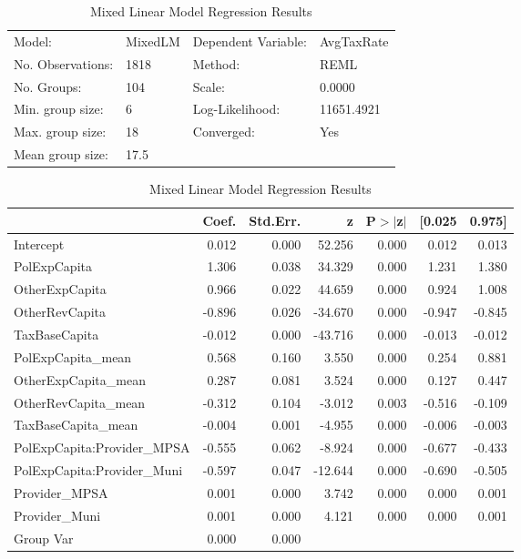 \begin{table}
\caption{Mixed Linear Model Regression Results}
\label{}
\begin{center}
\begin{tabular}{llll}
\hline
Model:            & MixedLM & Dependent Variable: & AvgTaxRate  \\
No. Observations: & 1818    & Method:             & REML        \\
No. Groups:       & 104     & Scale:              & 0.0000      \\
Min. group size:  & 6       & Log-Likelihood:     & 11651.4921  \\
Max. group size:  & 18      & Converged:          & Yes         \\
Mean group size:  & 17.5    &                     &             \\
\hline
\end{tabular}
\end{center}

\begin{center}
\begin{tabular}{lrrrrrr}
\hline
                            &  Coef. & Std.Err. &       z & P$> |$z$|$ & [0.025 & 0.975]  \\
\hline
Intercept                   &  0.012 &    0.000 &  52.256 &       0.000 &  0.012 &  0.013  \\
PolExpCapita                &  1.306 &    0.038 &  34.329 &       0.000 &  1.231 &  1.380  \\
OtherExpCapita              &  0.966 &    0.022 &  44.659 &       0.000 &  0.924 &  1.008  \\
OtherRevCapita              & -0.896 &    0.026 & -34.670 &       0.000 & -0.947 & -0.845  \\
TaxBaseCapita               & -0.012 &    0.000 & -43.716 &       0.000 & -0.013 & -0.012  \\
PolExpCapita\_mean          &  0.568 &    0.160 &   3.550 &       0.000 &  0.254 &  0.881  \\
OtherExpCapita\_mean        &  0.287 &    0.081 &   3.524 &       0.000 &  0.127 &  0.447  \\
OtherRevCapita\_mean        & -0.312 &    0.104 &  -3.012 &       0.003 & -0.516 & -0.109  \\
TaxBaseCapita\_mean         & -0.004 &    0.001 &  -4.955 &       0.000 & -0.006 & -0.003  \\
PolExpCapita:Provider\_MPSA & -0.555 &    0.062 &  -8.924 &       0.000 & -0.677 & -0.433  \\
PolExpCapita:Provider\_Muni & -0.597 &    0.047 & -12.644 &       0.000 & -0.690 & -0.505  \\
Provider\_MPSA              &  0.001 &    0.000 &   3.742 &       0.000 &  0.000 &  0.001  \\
Provider\_Muni              &  0.001 &    0.000 &   4.121 &       0.000 &  0.000 &  0.001  \\
Group Var                   &  0.000 &    0.000 &         &             &        &         \\
\hline
\end{tabular}
\end{center}
\end{table}
\bigskip
